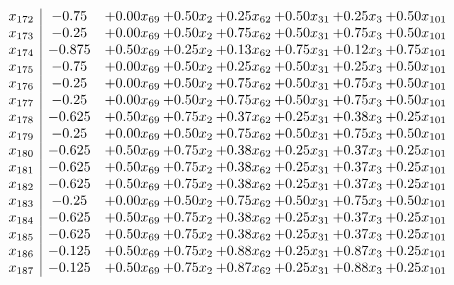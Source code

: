 \documentclass[8pt]{article}
\begin{document}
\[\begin{array}{c| c c@{\hskip 2pt} c@{\hskip 2pt} c@{\hskip 2pt} c@{\hskip 2pt} c@{\hskip 2pt} c@{\hskip 2pt} }
 x_{172}   &  -0.75 & +  0.00 x_{69} & +  0.50 x_{2} & +  0.25 x_{62} & +  0.50 x_{31} & +  0.25 x_{3} & +  0.50 x_{101}\\
 x_{173}   &  -0.25 & +  0.00 x_{69} & +  0.50 x_{2} & +  0.75 x_{62} & +  0.50 x_{31} & +  0.75 x_{3} & +  0.50 x_{101}\\
 x_{174}   &  -0.875 & +  0.50 x_{69} & +  0.25 x_{2} & +  0.13 x_{62} & +  0.75 x_{31} & +  0.12 x_{3} & +  0.75 x_{101}\\
 x_{175}   &  -0.75 & +  0.00 x_{69} & +  0.50 x_{2} & +  0.25 x_{62} & +  0.50 x_{31} & +  0.25 x_{3} & +  0.50 x_{101}\\
 x_{176}   &  -0.25 & +  0.00 x_{69} & +  0.50 x_{2} & +  0.75 x_{62} & +  0.50 x_{31} & +  0.75 x_{3} & +  0.50 x_{101}\\
 x_{177}   &  -0.25 & +  0.00 x_{69} & +  0.50 x_{2} & +  0.75 x_{62} & +  0.50 x_{31} & +  0.75 x_{3} & +  0.50 x_{101}\\
 x_{178}   &  -0.625 & +  0.50 x_{69} & +  0.75 x_{2} & +  0.37 x_{62} & +  0.25 x_{31} & +  0.38 x_{3} & +  0.25 x_{101}\\
 x_{179}   &  -0.25 & +  0.00 x_{69} & +  0.50 x_{2} & +  0.75 x_{62} & +  0.50 x_{31} & +  0.75 x_{3} & +  0.50 x_{101}\\
 x_{180}   &  -0.625 & +  0.50 x_{69} & +  0.75 x_{2} & +  0.38 x_{62} & +  0.25 x_{31} & +  0.37 x_{3} & +  0.25 x_{101}\\
 x_{181}   &  -0.625 & +  0.50 x_{69} & +  0.75 x_{2} & +  0.38 x_{62} & +  0.25 x_{31} & +  0.37 x_{3} & +  0.25 x_{101}\\
 x_{182}   &  -0.625 & +  0.50 x_{69} & +  0.75 x_{2} & +  0.38 x_{62} & +  0.25 x_{31} & +  0.37 x_{3} & +  0.25 x_{101}\\
 x_{183}   &  -0.25 & +  0.00 x_{69} & +  0.50 x_{2} & +  0.75 x_{62} & +  0.50 x_{31} & +  0.75 x_{3} & +  0.50 x_{101}\\
 x_{184}   &  -0.625 & +  0.50 x_{69} & +  0.75 x_{2} & +  0.38 x_{62} & +  0.25 x_{31} & +  0.37 x_{3} & +  0.25 x_{101}\\
 x_{185}   &  -0.625 & +  0.50 x_{69} & +  0.75 x_{2} & +  0.38 x_{62} & +  0.25 x_{31} & +  0.37 x_{3} & +  0.25 x_{101}\\
 x_{186}   &  -0.125 & +  0.50 x_{69} & +  0.75 x_{2} & +  0.88 x_{62} & +  0.25 x_{31} & +  0.87 x_{3} & +  0.25 x_{101}\\
 x_{187}   &  -0.125 & +  0.50 x_{69} & +  0.75 x_{2} & +  0.87 x_{62} & +  0.25 x_{31} & +  0.88 x_{3} & +  0.25 x_{101}\\

\end{array}\]
\end{document}
